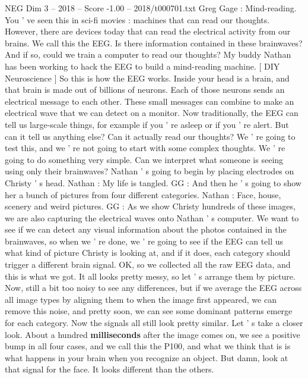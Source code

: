 \begin{textsample}{NEG Dim 3 – 2018 – Score -1.00 – 2018/t000701.txt}  \label{ex:f3_neg_066}
Greg Gage : Mind-reading.
You ' ve seen this in sci-fi movies : machines that can read our thoughts.
However, there are devices today that can read the electrical activity from our brains.
We call this the EEG.
Is there information contained in these brainwaves?
And if so, could we train a computer to read our thoughts?
My buddy Nathan has been working to hack the EEG to build a mind-reading machine. [ DIY Neuroscience ] So this is how the EEG works.
Inside your head is a brain, and that brain is made out of billions of neurons.
Each of those neurons sends an electrical message to each other.
These small messages can combine to make an electrical wave that we can detect on a monitor.
Now traditionally, the EEG can tell us large-scale things, for example if you ' re asleep or if you ' re alert.
But can it tell us anything else?
Can it actually read our thoughts?
We ' re going to test this, and we ' re not going to start with some complex thoughts.
We ' re going to do something very simple.
Can we interpret what someone is seeing using only their brainwaves?
Nathan ' s going to begin by placing electrodes on Christy ' s head.
Nathan : My life is tangled.
GG : And then he ' s going to show her a bunch of pictures from four different categories.
Nathan : Face, house, scenery and weird pictures.
GG : As we show Christy hundreds of these images, we are also capturing the electrical waves onto Nathan ' s computer.
We want to see if we can detect any visual information about the photos contained in the brainwaves, so when we ' re done, we ' re going to see if the EEG can tell us what kind of picture Christy is looking at, and if it does, each category should trigger a different brain signal.
OK, so we collected all the raw EEG data, and this is what we got.
It all looks pretty messy, so let ' s arrange them by picture.
Now, still a bit too noisy to see any differences, but if we average the EEG across all image types by aligning them to when the image first appeared, we can remove this noise, and pretty soon, we can see some dominant patterns emerge for each category.
Now the signals all still look pretty similar.
Let ' s take a closer look.
About a hundred \textbf{milliseconds} after the image comes on, we see a positive bump in all four cases, and we call this the P100, and what we think that is is what happens in your brain when you recognize an object.
But damn, look at that signal for the face.
It looks different than the others.

\end{textsample}
